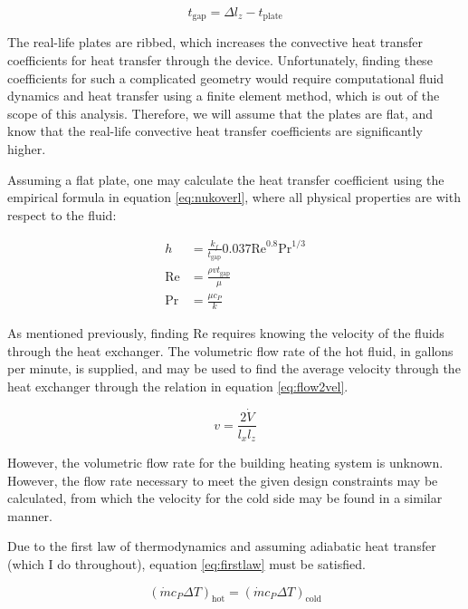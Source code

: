 \documentclass[12pt,letterpaper]{article}
\begin{document}
\begin{equation}
\label{eq:spacing}
t_{\textrm{gap}} = \Delta l_z - t_{\textrm{plate}}
\end{equation}

The real-life plates are ribbed, which increases the convective heat transfer coefficients for heat transfer through the device. Unfortunately, finding these coefficients for such a complicated geometry would require computational fluid dynamics and heat transfer using a finite element method, which is out of the scope of this analysis.  Therefore, we will assume that the plates are flat, and know that the real-life convective heat transfer coefficients are significantly higher.

Assuming a flat plate, one may calculate the heat transfer coefficient using the empirical formula in equation \ref{eq:nukoverl}, where all physical properties are with respect to the fluid:

\begin{align}
\label{eq:nukoverl}
h &=\frac{k_f}{t_{\textrm{gap}}} 0.037\textrm{Re}^{0.8}\textrm{Pr}^{1/3}\\
\label{eq:re}
\textrm{Re}&=\frac{\rho v t_{\textrm{gap}}}{\mu}\\
\label{eq:pr}
\textrm{Pr}&=\frac{\mu c_P}{k}
\end{align}

As mentioned previously, finding Re requires knowing the velocity of the fluids through the heat exchanger.  The volumetric flow rate of the hot fluid, in gallons per minute, is supplied, and may be used to find the average velocity through the heat exchanger through the relation in equation \ref{eq:flow2vel}.

\begin{equation}
\label{eq:flow2vel}
v = \frac{2\dot{V}}{l_x l_z}
\end{equation}

However, the volumetric flow rate for the building heating system is unknown. However, the flow rate necessary to meet the given design constraints may be calculated, from which the velocity for the cold side may be found in a similar manner. 

Due to the first law of thermodynamics and assuming adiabatic heat transfer (which I do throughout), equation \ref{eq:firstlaw} must be satisfied.

\begin{equation}
\label{eq:firstlaw}
\left(\dot{m} c_P \Delta T \right)_{\textrm{hot}} = \left(\dot{m} c_P \Delta T \right)_{\textrm{cold}}
\end{equation}
\end{document}
